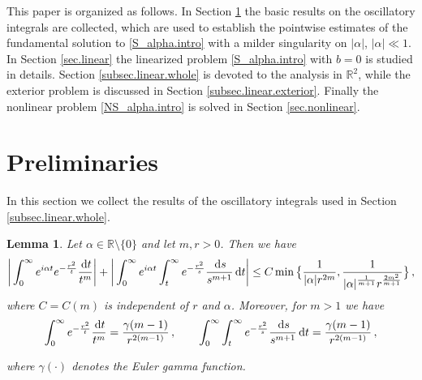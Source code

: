 \documentclass[11pt,a4paper]{article}
\newtheorem{lemma}[theorem]{Lemma}
\newcommand{\R}{\mathbb{R}}
\newcommand{\dd}{\,{\rm d}}
\begin{document}
This paper is organized as follows. In Section \ref{sec.pre} the basic results on the oscillatory integrals are collected, which are used to establish the pointwise estimates of the fundamental solution to \eqref{S_alpha.intro} with a milder singularity on $|\alpha|$, $|\alpha|\ll 1$. In Section \ref{sec.linear} the linearized problem \eqref{S_alpha.intro} with $b=0$ is studied in details. Section \ref{subsec.linear.whole} is devoted to the analysis in $\R^2$, while the exterior problem is discussed in Section \ref{subsec.linear.exterior}. Finally the nonlinear problem \eqref{NS_alpha.intro} is solved in Section \ref{sec.nonlinear}.








\section{Preliminaries}\label{sec.pre}

In this section we collect the results of the oscillatory integrals used in Section \ref{subsec.linear.whole}.


\begin{lemma}\label{lem.thm.linear.whole.2}
Let $\alpha \in \R \setminus \{0\}$ 
and let $m, r>0$. Then we have
%
\begin{equation}\label{est.lem.thm.linear.whole.2.1}
\bigg| 
\int_{0}^{\infty} e^{i\alpha t} e^{ -\frac{r^2}{t} }\frac{\dd t}{t^m} \bigg| 
+
\bigg| 
\int_{0}^{\infty} e^{i\alpha t} \int_{t}^{\infty}
e^{ -\frac{r^2}{s} } \frac{\dd s}{s^{m+1}} \dd t \bigg| 
\leq C 
\min
\big\{
\frac{1}{|\alpha |r^{2m}},
\frac{1}{ |\alpha|^{\frac{1}{m+1}} r^{\frac{2m^2}{m+1}}}
\big\}\,,
\end{equation}
%
where  $C=C(m)$ is independent of $r$ and $\alpha$. 
Moreover, for $m> 1$ we have
%
\begin{equation}\label{est.lem.thm.linear.whole.2.2}
\int_{0}^{\infty} e^{ -\frac{r^2}{t} } \frac{ \dd t }{ t^m }  
= \frac{ \gamma(m-1) }{ r^{2(m-1)} }\,, 
\qquad
\displaystyle \int_{0}^{\infty} 
\displaystyle \int_{t}^{\infty}
e^{ -\frac{r^2}{s} } \frac{\dd s}{s^{m+1}} \dd t
= \frac{ \gamma(m-1) }{ r^{2(m-1)} }\,, 
\end{equation}

\noindent 
where $\gamma(\cdot)$ denotes the Euler gamma function.
\end{lemma}
\end{document}
